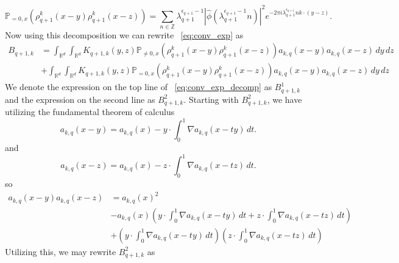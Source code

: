 \documentclass[12pt,reqno,letterpaper]{amsart}
\numberwithin{equation}{section}
\newcommand{\1}{{\bf 1}}
\newcommand{\2}{{\bf 2}}
\newcommand{\R}{\mathbb R}
\newcommand{\Z}{\mathbb Z}
\theoremstyle{remark}
\theoremstyle{remark}
\begin{document}
\begin{equation}\label{eq:mean}
    \mathbb{P}_{=0,x}\left(\rho_{q+1}^k(x-y) \rho_{q+1}^k(x-z)\right) = \sum_{n \in \Z} \lambda_{q+1}^{\epsilon_{q+1}-1} \left|\hat{\phi}\left(\lambda_{q+1}^{\epsilon_{q+1}-1}n\right)\right|^2 e^{-2\pi i \lambda_{q+1}^{\epsilon_{q+1}} n k \cdot (y-z)}.
\end{equation}
Now using this decomposition we can rewrite ~\eqref{eq:conv_exp} as
\begin{equation}\label{eq:conv_exp_decomp}
    \begin{split}
        B_{q+1,k} &= \int_{\R^d} \int_{\R^d} K_{q+1,k}(y,z) \mathbb{P}_{\not=0,x}\left(\rho_{q+1}^k(x-y) \rho_{q+1}^k(x-z)\right) a_{k,q}(x-y) a_{k,q}(x-z)\, dy\, dz\\
        &+ \int_{\R^d} \int_{\R^d} K_{q+1,k}(y,z) \mathbb{P}_{=0,x}\left(\rho_{q+1}^k(x-y) \rho_{q+1}^k(x-z)\right) a_{k,q}(x-y) a_{k,q}(x-z)\, dy\, dz
    \end{split}
\end{equation}
We denote the expression on the top line of ~\eqref{eq:conv_exp_decomp} as $B_{q+1,k}^1$ and the expression on the second line as $B_{q+1,k}^2$. Starting with $B_{q+1,k}^2$, we have utilizing the fundamental theorem of calculus
\begin{equation*}\label{eq:FTC1}
    a_{k,q}(x-y) = a_{k,q}(x) - y \cdot \int_0^1 \nabla a_{k,q}(x - ty)\, dt.
\end{equation*}
and
\begin{equation*}
    a_{k,q}(x-z) = a_{k,q}(x) - z \cdot \int_0^1 \nabla a_{k,q}(x - tz)\, dt.
\end{equation*}
so
\begin{equation*}
    \begin{split}
        a_{k,q}(x-y)a_{k,q}(x-z) &= a_{k,q}(x)^2\\
        &- a_{k,q}(x) \left(y \cdot \int_0^1 \nabla a_{k,q}(x - ty)\, dt + z \cdot \int_0^1 \nabla a_{k,q}(x - tz)\, dt\right)\\
        &+ \left(y \cdot \int_0^1 \nabla a_{k,q}(x - ty)\, dt\right)\left(z \cdot \int_0^1 \nabla a_{k,q}(x - tz)\, dt\right)
    \end{split}
\end{equation*}
Utilizing this, we may rewrite $B_{q+1,k}^2$ as
\end{document}
